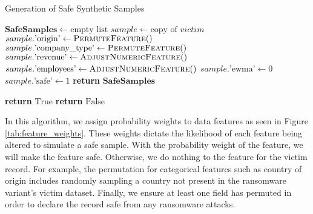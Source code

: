 \documentclass[running heads]{llncs}
\begin{document}
\begin{algorithm}
\caption{Generation of Safe Synthetic Samples}
\begin{algorithmic}[1] %
    \State $\mathbf{SafeSamples} \gets \text{empty list}$ 
     
         
             
                \State $sample \gets \text{copy of } victim$ 
                \Repeat
                    \State {}
                    \State $sample.\text{'origin'} \gets \Call{PermuteFeature}$
                    \State $sample.\text{'company\_type'} \gets \Call{PermuteFeature}$
                    \State $sample.\text{'revenue'} \gets \Call{AdjustNumericFeature}$
                    \State $sample.\text{'employees'} \gets \Call{AdjustNumericFeature}$
                    \State $sample.\text{'ewma'} \gets 0$ 
                    \State $sample.\text{'safe'} \gets 1$ 
                \State {}
            \EndFor
        \EndFor
    \EndFor
    \State \textbf{return} $\mathbf{SafeSamples}$
\EndProcedure

            \State \textbf{return} $\text{True}$
        \EndIf
    \EndFor
    \State \textbf{return} $\text{False}$
\EndFunction

\end{algorithmic}
\end{algorithm}


In this algorithm, we assign probability weights to data features as seen in Figure \ref{tab:feature_weights}. These weights dictate the likelihood of each feature being altered to simulate a safe sample. With the probability weight of the feature, we will make the feature safe. Otherwise, we do nothing to the feature for the victim record. For example, the permutation for categorical features such as country of origin includes randomly sampling a country not present in the ransomware variant's victim dataset. Finally, we ensure at least one field has permuted in order to declare the record safe from any ransomware attacks.
\end{document}

